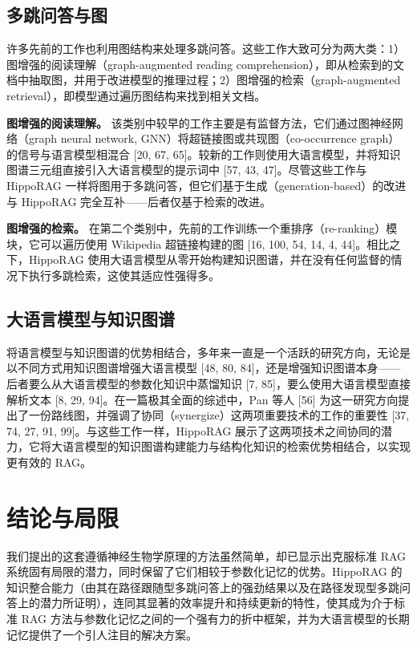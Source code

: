\documentclass[11pt,UTF8,fontset=fandol]{ctexart}
\begin{document}
\subsection{多跳问答与图}

许多先前的工作也利用图结构来处理多跳问答。这些工作大致可分为两大类：1）图增强的阅读理解（graph-augmented reading comprehension），即从检索到的文档中抽取图，并用于改进模型的推理过程；2）图增强的检索（graph-augmented retrieval），即模型通过遍历图结构来找到相关文档。

\textbf{图增强的阅读理解。} 该类别中较早的工作主要是有监督方法，它们通过图神经网络（graph neural network, GNN）将超链接图或共现图（co-occurrence graph）的信号与语言模型相混合 [20, 67, 65]。较新的工作则使用大语言模型，并将知识图谱三元组直接引入大语言模型的提示词中 [57, 43, 47]。尽管这些工作与 HippoRAG 一样将图用于多跳问答，但它们基于生成（generation-based）的改进与 HippoRAG 完全互补——后者仅基于检索的改进。

\textbf{图增强的检索。} 在第二个类别中，先前的工作训练一个重排序（re-ranking）模块，它可以遍历使用 Wikipedia 超链接构建的图 [16, 100, 54, 14, 4, 44]。相比之下，HippoRAG 使用大语言模型从零开始构建知识图谱，并在没有任何监督的情况下执行多跳检索，这使其适应性强得多。

\subsection{大语言模型与知识图谱}

将语言模型与知识图谱的优势相结合，多年来一直是一个活跃的研究方向，无论是以不同方式用知识图谱增强大语言模型 [48, 80, 84]，还是增强知识图谱本身——后者要么从大语言模型的参数化知识中蒸馏知识 [7, 85]，要么使用大语言模型直接解析文本 [8, 29, 94]。在一篇极其全面的综述中，Pan 等人 [56] 为这一研究方向提出了一份路线图，并强调了协同（synergize）这两项重要技术的工作的重要性 [37, 74, 27, 91, 99]。与这些工作一样，HippoRAG 展示了这两项技术之间协同的潜力，它将大语言模型的知识图谱构建能力与结构化知识的检索优势相结合，以实现更有效的 RAG。

\section{结论与局限}

我们提出的这套遵循神经生物学原理的方法虽然简单，却已显示出克服标准 RAG 系统固有局限的潜力，同时保留了它们相较于参数化记忆的优势。HippoRAG 的知识整合能力（由其在路径跟随型多跳问答上的强劲结果以及在路径发现型多跳问答上的潜力所证明），连同其显著的效率提升和持续更新的特性，使其成为介于标准 RAG 方法与参数化记忆之间的一个强有力的折中框架，并为大语言模型的长期记忆提供了一个引人注目的解决方案。
\end{document}
